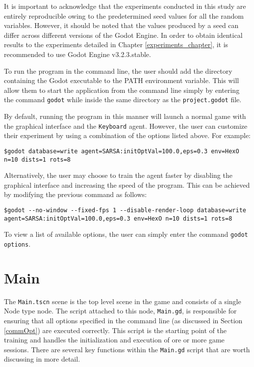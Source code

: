 It is important to acknowledge that the experiments conducted in this study are entirely reproducible owing to the predetermined seed values for all the random variables. However, it should be noted that the values produced by a seed can differ across different versions of the Godot Engine. In order to obtain identical results to the experiments detailed in Chapter \ref{experiments_chapter}, it is recommended to use Godot Engine v3.2.3.stable.

To run the program in the command line, the user should add the directory containing the Godot executable to the PATH environment variable. This will allow them to start the application from the command line simply by entering the command \texttt{godot} while inside the same directory as the \texttt{project.godot} file.

By default, running the program in this manner will launch a normal game with the graphical interface and the \texttt{Keyboard} agent. However, the user can customize their experiment by using a combination of the options listed above. For example:

\begin{center}
\hrulefill
\begin{lstlisting}
$godot database=write agent=SARSA:initOptVal=100.0,eps=0.3 env=HexO n=10 dists=1 rots=8
\end{lstlisting}
\hrulefill
\end{center}

Alternatively, the user may choose to train the agent faster by disabling the graphical interface and increasing the speed of the program. This can be achieved by modifying the previous command as follows:

\begin{center}
\hrulefill
\begin{lstlisting}
$godot --no-window --fixed-fps 1 --disable-render-loop database=write agent=SARSA:initOptVal=100.0,eps=0.3 env=HexO n=10 dists=1 rots=8
\end{lstlisting}
\hrulefill
\end{center}

To view a list of available options, the user can simply enter the command \texttt{godot options}.

\section{Main}
The \texttt{Main.tscn} scene is the top level scene in the game and consists of a single Node type node. The script attached to this node, \texttt{Main.gd}, is responsible for ensuring that all options specified in the command line (as discussed in Section \ref{commOpt}) are executed correctly. This script is the starting point of the training and handles the initialization and execution of ore or more game sessions.
There are several key functions within the \texttt{Main.gd} script that are worth discussing in more detail.


